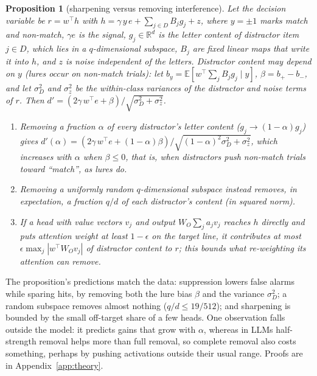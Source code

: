\documentclass{article}
\newtheorem{proposition}{Proposition}
\begin{document}
\begin{proposition}[sharpening versus removing interference]\label{prop:interference}
Let the decision variable be $r=w^\top h$ with $h=\gamma\,y\,e+\sum_{j\in D}B_j g_j+z$, where $y=\pm1$ marks match and non-match, $\gamma e$ is the signal, $g_j\in\mathbb{R}^d$ is the letter content of distractor item $j\in D$, which lies in a $q$-dimensional subspace, $B_j$ are fixed linear maps that write it into $h$, and $z$ is noise independent of the letters. Distractor content may depend on $y$ (lures occur on non-match trials): let $b_y=\mathbb{E}[w^\top\sum_jB_jg_j\mid y]$, $\beta=b_{+}-b_{-}$, and let $\sigma_D^2$ and $\sigma_z^2$ be the within-class variances of the distractor and noise terms of $r$. Then $d'=(2\gamma\,w^\top e+\beta)/\sqrt{\sigma_D^2+\sigma_z^2}$.
\begin{enumerate}\setlength{\itemsep}{1pt}\setlength{\topsep}{2pt}
  \item[(a)] Removing a fraction $\alpha$ of every distractor's letter content ($g_j\to(1-\alpha)g_j$) gives $d'(\alpha)=(2\gamma\,w^\top e+(1-\alpha)\beta)/\sqrt{(1-\alpha)^2\sigma_D^2+\sigma_z^2}$, which increases with $\alpha$ when $\beta\le0$, that is, when distractors push non-match trials toward ``match'', as lures do.
  \item[(b)] Removing a uniformly random $q$-dimensional subspace instead removes, in expectation, a fraction $q/d$ of each distractor's content (in squared norm).
  \item[(c)] If a head with value vectors $v_j$ and output $W_O\sum_j a_j v_j$ reaches $h$ directly and puts attention weight at least $1-\epsilon$ on the target line, it contributes at most $\epsilon\max_j|w^\top W_O v_j|$ of distractor content to $r$; this bounds what re-weighting its attention can remove.
\end{enumerate}
\end{proposition}

The proposition's predictions match the data: suppression lowers false alarms while sparing hits, by removing both the lure bias $\beta$ and the variance $\sigma_D^2$; a random subspace removes almost nothing ($q/d\le19/512$); and sharpening is bounded by the small off-target share of a few heads. One observation falls outside the model: it predicts gains that grow with $\alpha$, whereas in LLMs half-strength removal helps more than full removal, so complete removal also costs something, perhaps by pushing activations outside their usual range. Proofs are in Appendix~\ref{app:theory}.
\end{document}
